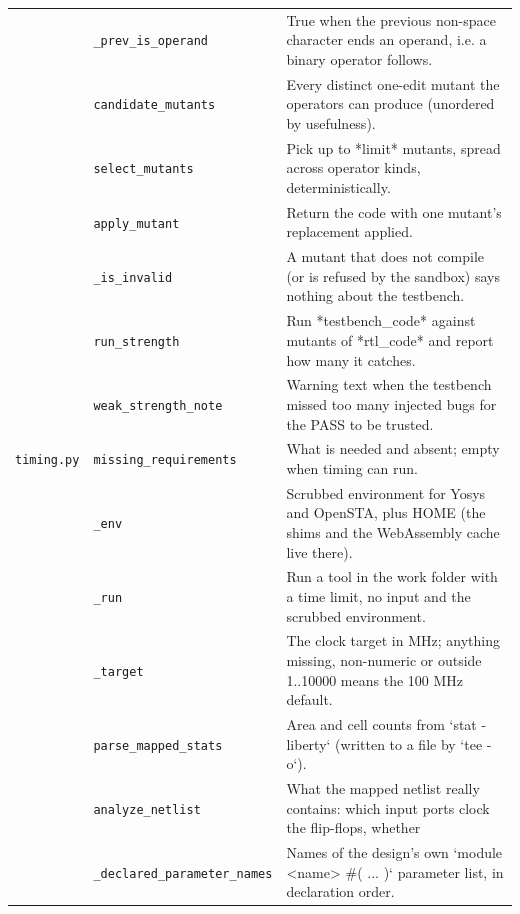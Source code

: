 \begin{longtable}{@{}p{2.8cm}>{\raggedright\arraybackslash}p{4.6cm}p{7.9cm}@{}}
{\small } & \texttt{\small \_\allowbreak{}prev\_\allowbreak{}is\_\allowbreak{}operand} & True when the previous non-space character ends an operand, i.e. a binary operator follows. \\
{\small } & \texttt{\small candidate\_\allowbreak{}mutants} & Every distinct one-edit mutant the operators can produce (unordered by usefulness). \\
{\small } & \texttt{\small select\_\allowbreak{}mutants} & Pick up to *limit* mutants, spread across operator kinds, deterministically. \\
{\small } & \texttt{\small apply\_\allowbreak{}mutant} & Return the code with one mutant's replacement applied. \\
{\small } & \texttt{\small \_\allowbreak{}is\_\allowbreak{}invalid} & A mutant that does not compile (or is refused by the sandbox) says nothing about the testbench. \\
{\small } & \texttt{\small run\_\allowbreak{}strength} & Run *testbench\_code* against mutants of *rtl\_code* and report how many it catches. \\
{\small } & \texttt{\small weak\_\allowbreak{}strength\_\allowbreak{}note} & Warning text when the testbench missed too many injected bugs for the PASS to be trusted. \\
{\small \nolinkurl{timing.py}} & \texttt{\small missing\_\allowbreak{}requirements} & What is needed and absent; empty when timing can run. \\
{\small } & \texttt{\small \_\allowbreak{}env} & Scrubbed environment for Yosys and OpenSTA, plus HOME (the shims and the WebAssembly cache live there). \\
{\small } & \texttt{\small \_\allowbreak{}run} & Run a tool in the work folder with a time limit, no input and the scrubbed environment. \\
{\small } & \texttt{\small \_\allowbreak{}target} & The clock target in MHz; anything missing, non-numeric or outside 1..10000 means the 100 MHz default. \\
{\small } & \texttt{\small parse\_\allowbreak{}mapped\_\allowbreak{}stats} & Area and cell counts from `stat -liberty` (written to a file by `tee -o`). \\
{\small } & \texttt{\small analyze\_\allowbreak{}netlist} & What the mapped netlist really contains: which input ports clock the flip-flops, whether \\
{\small } & \texttt{\small \_\allowbreak{}declared\_\allowbreak{}parameter\_\allowbreak{}names} & Names of the design's own `module \textless{}name\textgreater{} \#( ... )` parameter list, in declaration order. \\

\end{longtable}
